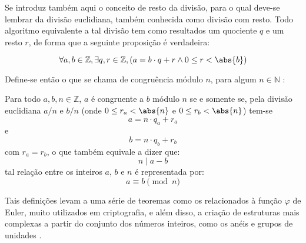 Se introduz também aqui o conceito de resto da divisão, para o qual deve-se lembrar da divisão euclidiana, também conhecida como divisão com resto. Todo algoritmo equivalente a tal divisão tem como resultados um quociente $q$ e um resto $r$, de forma que a seguinte proposição é verdadeira:

\begin{equation*}
        \forall a, b \in \mathbb{Z}, \exists q, r \in \mathbb{Z}, (a = b \cdot q + r \land 0 \leq r < \abs{b})
\end{equation*}

Define-se então o que se chama de congruência módulo $n$, para algum $n \in \mathbb{N}$ \cite{book:2399854}:

\begin{definição}
    Para todo $a, b, n \in \mathbb{Z}$, $a$ é congruente a $b$ módulo $n$ se e somente se, pela divisão euclidiana $a/n$ e $b/n$ (onde $0 \leq r_a < \abs{n}$ e $0 \leq r_b < \abs{n}$) tem-se
    \begin{equation*}
        a = n \cdot q_a + r_a
    \end{equation*}
    e
    \begin{equation*}
        b = n \cdot q_b + r_b
    \end{equation*}
    com $r_a = r_b$, o que também equivale a dizer que:
    \begin{equation*}
        n \mid a - b
    \end{equation*}
    tal relação entre os inteiros $a$, $b$ e $n$ é representada por:
    \begin{equation*}
        a \equiv b \pmod{n}
    \end{equation*}
\end{definição}

Tais definições levam a uma série de teoremas como os relacionados à função $\varphi$ de Euler, muito utilizados em criptografia, e além disso, a criação de estruturas mais complexas a partir do conjunto dos números inteiros, como os anéis e grupos de unidades \cite{book:2399854}.

